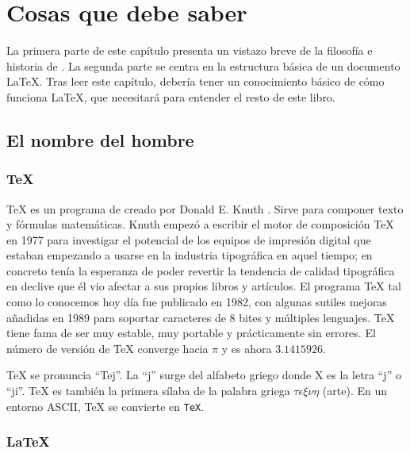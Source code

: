  
\chapter{Cosas que debe saber}
\begin{intro}
La primera parte de este capítulo presenta un vistazo breve de la filosofía e historia de \LaTeXe.  La segunda parte se centra en la estructura básica de un documento \LaTeX{}.  Tras leer este capítulo, debería tener un conocimiento básico de cómo funciona \LaTeX{}, que necesitará para entender el resto de este libro.
\end{intro}

\section{El nombre del hombre}
\subsection{\TeX}
 
\TeX{} es un programa de \computernomo{} creado por Donald E. Knuth \cite{texbook}. Sirve para componer texto y fórmulas matemáticas.  Knuth empezó a escribir el motor de composición \TeX{} en 1977 para investigar el potencial de los equipos de impresión digital que estaban empezando a usarse en la industria tipográfica en aquel tiempo; en concreto tenía la esperanza de poder revertir la tendencia de calidad tipográfica en declive que él vio afectar a sus propios libros y artículos.  El programa \TeX{} tal como lo conocemos hoy día fue publicado en 1982, con algunas sutiles mejoras añadidas en 1989 para soportar caracteres de 8 bites y múltiples lenguajes.  \TeX{} tiene fama de ser muy estable, muy portable y prácticamente sin errores.  El número de versión de \TeX{} converge hacia $\pi$ y es ahora $3.1415926$.
                                                                       
\TeX{} se pronuncia ``Tej''.  La ``j'' surge del alfabeto griego donde X es la letra ``j'' o ``ji''.  \TeX{} es también la primera sílaba de la palabra griega $\tau\epsilon\xi\nu\eta$ (arte).  En un entorno ASCII, \TeX{} se convierte en \texttt{TeX}.

\subsection{\LaTeX}
 
